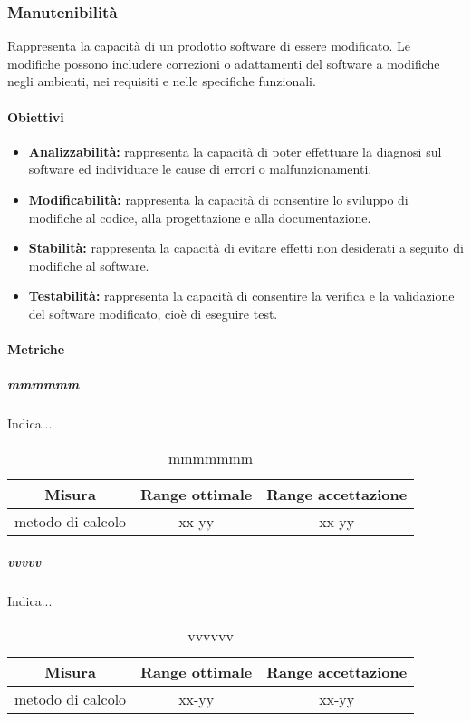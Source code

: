 	\subsubsection{Manutenibilità}
	Rappresenta la capacità di un prodotto software di essere modificato. Le modifiche possono includere correzioni o adattamenti del software a modifiche negli ambienti, nei requisiti e nelle specifiche funzionali.
	
		\paragraph{Obiettivi}
			\begin{itemize}
				\item \textbf{Analizzabilità:} rappresenta la capacità di poter effettuare la diagnosi sul software ed individuare le cause di errori o malfunzionamenti.
				\item \textbf{Modificabilità:} rappresenta la capacità di consentire lo sviluppo di modifiche al codice, alla progettazione e alla documentazione.
				\item \textbf{Stabilità:} rappresenta la capacità di evitare effetti non desiderati a seguito di modifiche al software.
				\item \textbf{Testabilità:} rappresenta la capacità di consentire la verifica e la validazione del software modificato, cioè di eseguire test.
			\end{itemize}
	
		\paragraph{Metriche}
			\subparagraph{mmmmmm}
			Indica...
				\begin{table}[H]
				\begin{center}
					\begin{tabular}{|c|c|c|}
						\hline
						\textbf{Misura} & \textbf{Range ottimale} & \textbf{Range accettazione} \\
						\hline
						metodo di calcolo & xx-yy  & xx-yy \\
						\hline
					\end{tabular}
				\end{center}
				\caption{mmmmmmm}
			\end{table}
	
			\subparagraph{vvvvv}
			Indica...
				\begin{table}[H]
					\begin{center}
						\begin{tabular}{|c|c|c|}
							\hline
							\textbf{Misura} & \textbf{Range ottimale} & \textbf{Range accettazione} \\
							\hline
							metodo di calcolo & xx-yy  & xx-yy \\
							\hline
						\end{tabular}
					\end{center}
					\caption{vvvvvv}
				\end{table}
	
